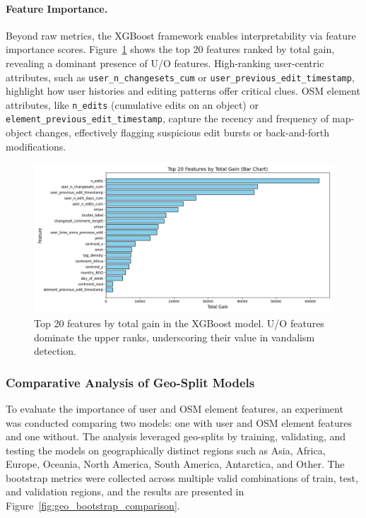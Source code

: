 \documentclass[
    13pt, %
    a4paper, %
    listof=totoc, %
    bibliography=totoc, %
    index=totoc, %
    headsepline
]{scrreprt}
\begin{document}
\paragraph{Feature Importance.}
Beyond raw metrics, the XGBoost framework enables interpretability via feature importance scores. Figure~\ref{fig:feature_importance} shows the top 20 features ranked by total gain, revealing a dominant presence of U/O features. High-ranking user-centric attributes, such as \texttt{user\_n\_changesets\_cum} or \texttt{user\_previous\_edit\_timestamp}, highlight how user histories and editing patterns offer critical clues. OSM element attributes, like \texttt{n\_edits} (cumulative edits on an object) or \texttt{element\_previous\_edit\_timestamp}, capture the recency and frequency of map-object changes, effectively flagging suspicious edit bursts or back-and-forth modifications.

\begin{figure}[H]
    \centering
    \includegraphics[width=\textwidth]{feature_importance.png}
    \caption{Top 20 features by total gain in the XGBoost model. U/O features dominate the upper ranks, underscoring their value in vandalism detection.}
    \label{fig:feature_importance}
\end{figure}

\subsubsection{Comparative Analysis of Geo-Split Models}
\label{sec:geo_split_analysis}

To evaluate the importance of user and OSM element features, an experiment was conducted comparing two models: one with user and OSM element features and one without. The analysis leveraged geo-splits by training, validating, and testing the models on geographically distinct regions such as Asia, Africa, Europe, Oceania, North America, South America, Antarctica, and Other. The bootstrap metrics were collected across multiple valid combinations of train, test, and validation regions, and the results are presented in Figure~\ref{fig:geo_bootstrap_comparison}.
\end{document}
